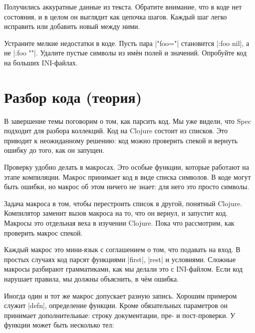 Получились аккуратные данные из текста. Обратите внимание, что в коде нет
состояния, и в целом он выглядит как цепочка шагов. Каждый шаг легко исправить
или добавить новый между ними.

Устраните мелкие недостатки в коде. Пусть пара \spverb|"foo="| становится
\spverb|{:foo nil}|, а не \spverb|{:foo ""}|.  Удалите пустые символы из
им\"{е}н полей и значений. Опробуйте код на больших INI-файлах.

\section{Разбор кода (теория)}


В завершение темы поговорим о том, как парсить код. Мы уже видели, что Spec
подходит для разбора коллекций. Код на Clojure состоит из списков. Это приводит
к неожиданному решению: код можно проверить спекой и вернуть ошибку до того, как
он запущен.

Проверку удобно делать в макросах. Это особые функции, которые работают на этапе
компиляции. Макрос принимает код в виде списка символов. В коде могут быть
ошибки, но макрос об этом ничего не знает: для него это просто символы.

Задача макроса в том, чтобы перестроить список в другой, понятный
Clojure. Компилятор заменит вызов макроса на то, что он вернул, и запустит
код. Макросы это отдельная веха в изучении Clojure. Пока что рассмотрим, как
проверить макрос спекой.

Каждый макрос это мини-язык с соглашением о том, что подавать на вход. В простых
случаях код парсят функциями \spverb|first|, \spverb|rest| и условиями. Сложные
макросы разбирают грамматиками, как мы делали это с INI-файлом. Если код
нарушает правила, мы должны объяснить, в ч\"{е}м ошибка.


Иногда один и тот же макрос допускает разную запись. Хорошим примером служит
\spverb|defn|, определение функции. Кроме обязательных параметров он принимает
дополнительные: строку документации, пре- и пост-проверки. У функции может быть
несколько тел:

